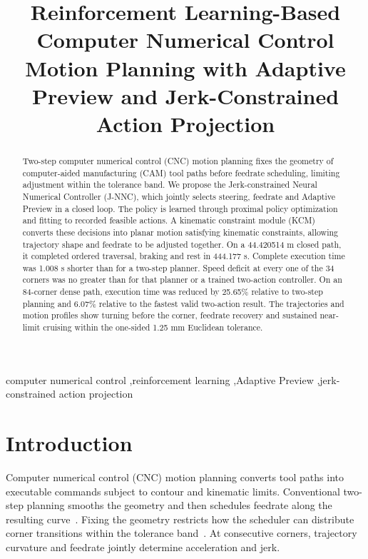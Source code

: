\documentclass[preprint,12pt,nonatbib]{elsarticle}
\begin{document}
\begin{frontmatter}

\title{Reinforcement Learning-Based Computer Numerical Control Motion Planning with Adaptive Preview and Jerk-Constrained Action Projection}

\begin{abstract}
Two-step computer numerical control (CNC) motion planning fixes the geometry of computer-aided manufacturing (CAM) tool paths before feedrate scheduling, limiting adjustment within the tolerance band. We propose the Jerk-constrained Neural Numerical Controller (J-NNC), which jointly selects steering, feedrate and Adaptive Preview in a closed loop. The policy is learned through proximal policy optimization and fitting to recorded feasible actions. A kinematic constraint module (KCM) converts these decisions into planar motion satisfying kinematic constraints, allowing trajectory shape and feedrate to be adjusted together. On a 44.420514 m closed path, it completed ordered traversal, braking and rest in 444.177 s. Complete execution time was 1.008 s shorter than for a two-step planner. Speed deficit at every one of the 34 corners was no greater than for that planner or a trained two-action controller. On an 84-corner dense path, execution time was reduced by 25.65\% relative to two-step planning and 6.07\% relative to the fastest valid two-action result. The trajectories and motion profiles show turning before the corner, feedrate recovery and sustained near-limit cruising within the one-sided 1.25 mm Euclidean tolerance.
\end{abstract}

\begin{keyword}
computer numerical control \sep reinforcement learning \sep Adaptive Preview \sep jerk-constrained action projection
\end{keyword}

\end{frontmatter}

\section{Introduction}
\label{sec:introduction}
Computer numerical control (CNC) motion planning converts tool paths into executable commands subject to contour and kinematic limits. Conventional two-step planning smooths the geometry and then schedules feedrate along the resulting curve~\citep{Sun2022,Yan2023}. Fixing the geometry restricts how the scheduler can distribute corner transitions within the tolerance band~\citep{Erkorkmaz2001,Lee2011}. At consecutive corners, trajectory curvature and feedrate jointly determine acceleration and jerk.
\end{document}
